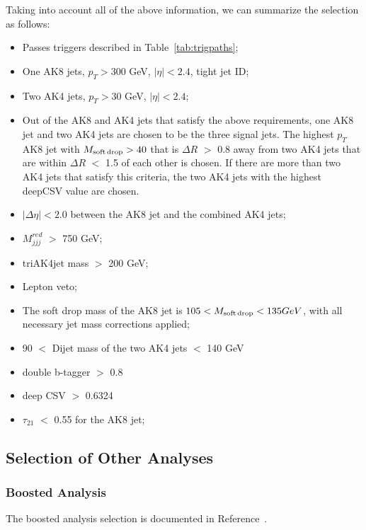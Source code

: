 Taking into account all of the above information, we can summarize the selection as follows:

\begin{itemize}
\item Passes triggers described in Table~\ref{tab:trigpaths};
\item One AK8 jets, $p_{T} > 300$ GeV, $|\eta| < 2.4$, tight jet ID;
\item Two AK4 jets, $p_{T} > 30$ GeV, $|\eta| < 2.4$;
\item Out of the AK8 and AK4 jets that satisfy the above requirements, one AK8 jet and two AK4 jets are chosen to be the three signal jets. The highest $p_{T}$ AK8 jet with $M_{\rm soft\,drop} > 40$ \GeV that is $\Delta R$ $>$ 0.8 away from two AK4 jets that are within $\Delta R$ $<$ 1.5 of each other is chosen. If there are more than two AK4 jets that satisfy this criteria, the two AK4 jets with the highest deepCSV value are chosen.
\item $|\Delta\eta| < 2.0$ between the AK8 jet and the combined AK4 jets;
\item $M_{jjj}^{red}$ $>$ 750 GeV;
\item triAK4jet mass $>$ 200 GeV;
\item Lepton veto;
\item The soft drop mass of the AK8 jet is $105 < M_{\rm soft\,drop} < 135GeV$, with all necessary jet mass corrections applied;
\item 90 $<$ Dijet mass of the two AK4 jets $<$ 140 GeV
\item double b-tagger $>$ 0.8
\item deep CSV $>$ 0.6324
\item $\tau_{21}$ $<$ 0.55 for the AK8 jet;
\end{itemize}

\subsection{Selection of Other Analyses\label{ss:boostres}}

\subsubsection{Boosted Analysis\label{sss:boost}}

The boosted analysis selection is documented in Reference~\cite{Sirunyan:2017isc}.

